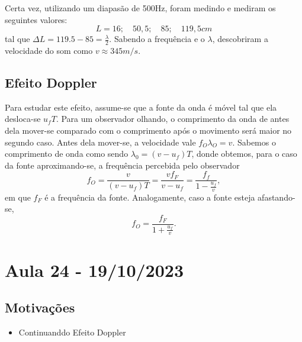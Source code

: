 \documentclass{article}
\begin{document}
Certa vez, utilizando um diapasão de 500Hz, foram medindo e mediram os seguintes valores: 
\[
  L = 16;\quad50,5;\quad85;\quad119,5cm
\]
tal que \(\Delta L = 119.5 - 85 = \frac{\lambda }{2}\). Sabendo a frequência e o \(\lambda \), descobriram a velocidade do som como \(v\approx 345m/s.\)
\subsection{Efeito Doppler}
Para estudar este efeito, assume-se que a fonte da onda é móvel tal que ela desloca-se \(u_{f}T\). Para um observador olhando, o comprimento da onda de antes dela
mover-se comparado com o comprimento após o movimento será maior no segundo caso. Antes dela mover-se, a velocidade vale \(f_{O}\lambda_{O} = v\).
Sabemos o comprimento de onda como sendo \(\lambda_{0} = (v-u_{f})T\), donde obtemos, para o caso da fonte aproximando-se, a frequência percebida pelo observador
\[
  f_{O} = \frac{v}{(v-u_{f})T} = \frac{vf_{F}}{v-u_{f}} = \frac{f_{f}}{1-\frac{u_{f}}{v}},
\]
em que \(f_{F}\) é a frequência da fonte. Analogamente, caso a fonte esteja afastando-se, 
\[
  f_{O} = \frac{f_{F}}{1+\frac{u_{f}}{v}}.
\]
\newpage

\section{Aula 24 - 19/10/2023}
\subsection{Motivações}
\begin{itemize}
  \item Continuanddo Efeito Doppler
\end{itemize}
\end{document}
